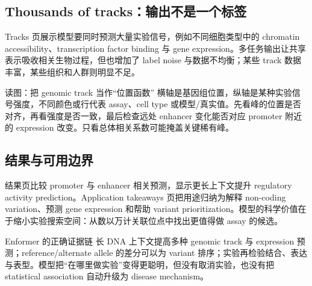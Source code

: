 \subsection{Thousands of tracks：输出不是一个标签}

Tracks 页展示模型要同时预测大量实验信号，例如不同细胞类型中的 chromatin accessibility、transcription factor binding 与 gene expression。多任务输出让共享表示吸收相关生物过程，但也增加了 label noise 与数据不均衡；某些 track 数据丰富，某些组织和人群则明显不足。


\begin{knowledgebox}{读图：把 genomic track 当作“位置函数”}
横轴是基因组位置，纵轴是某种实验信号强度，不同颜色或行代表 assay、cell type 或模型/真实值。先看峰的位置是否对齐，再看强度是否一致，最后检查远处 enhancer 变化能否对应 promoter 附近的 expression 改变。只看总体相关系数可能掩盖关键稀有峰。
\end{knowledgebox}

\subsection{结果与可用边界}

结果页比较 promoter 与 enhancer 相关预测，显示更长上下文提升 regulatory activity prediction。Application takeaways 页把用途归纳为解释 non-coding variation、预测 gene expression 和帮助 variant prioritization。模型的科学价值在于缩小实验搜索空间：从数以万计关联位点中找出更值得做 assay 的候选。




\begin{importantbox}{Enformer 的正确证据链}
长 DNA 上下文提高多种 genomic track 与 expression 预测；reference/alternate allele 的差分可以为 variant 排序；实验再检验结合、表达与表型。模型把“在哪里做实验”变得更聪明，但没有取消实验，也没有把 statistical association 自动升级为 disease mechanism。
\end{importantbox}

